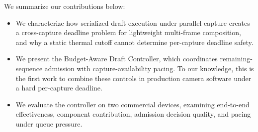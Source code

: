 We summarize our contributions below:
\begin{itemize}[leftmargin=1.2em]
  \item We characterize how serialized draft execution under parallel capture creates a cross-capture deadline problem for lightweight multi-frame composition, and why a static thermal cutoff cannot determine per-capture deadline safety.
  \item We present the Budget-Aware Draft Controller, which coordinates remaining-sequence admission with capture-availability pacing. To our knowledge, this is the first work to combine these controls in production camera software under a hard per-capture deadline.
  \item We evaluate the controller on two commercial devices, examining end-to-end effectiveness, component contribution, admission decision quality, and pacing under queue pressure.
\end{itemize}

